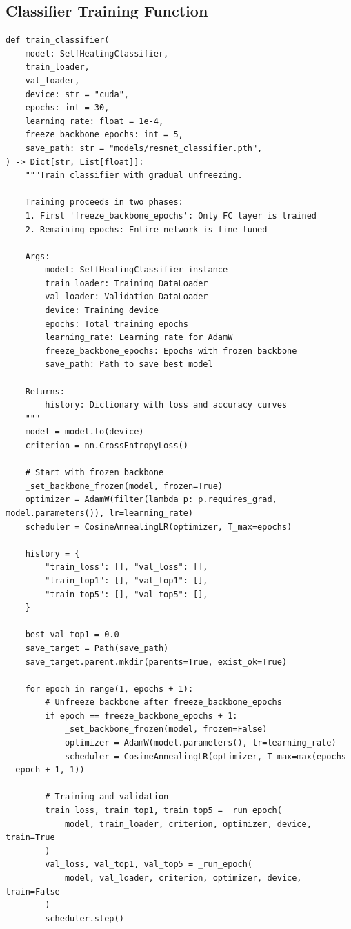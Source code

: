 \documentclass[11pt,a4paper]{article}
\begin{document}
\subsection{Classifier Training Function}

\begin{lstlisting}[caption={src/train\_classifier.py - Main Training Function}, label={lst:train-classifier}]
def train_classifier(
    model: SelfHealingClassifier,
    train_loader,
    val_loader,
    device: str = "cuda",
    epochs: int = 30,
    learning_rate: float = 1e-4,
    freeze_backbone_epochs: int = 5,
    save_path: str = "models/resnet_classifier.pth",
) -> Dict[str, List[float]]:
    """Train classifier with gradual unfreezing.

    Training proceeds in two phases:
    1. First 'freeze_backbone_epochs': Only FC layer is trained
    2. Remaining epochs: Entire network is fine-tuned

    Args:
        model: SelfHealingClassifier instance
        train_loader: Training DataLoader
        val_loader: Validation DataLoader
        device: Training device
        epochs: Total training epochs
        learning_rate: Learning rate for AdamW
        freeze_backbone_epochs: Epochs with frozen backbone
        save_path: Path to save best model

    Returns:
        history: Dictionary with loss and accuracy curves
    """
    model = model.to(device)
    criterion = nn.CrossEntropyLoss()

    # Start with frozen backbone
    _set_backbone_frozen(model, frozen=True)
    optimizer = AdamW(filter(lambda p: p.requires_grad, model.parameters()), lr=learning_rate)
    scheduler = CosineAnnealingLR(optimizer, T_max=epochs)

    history = {
        "train_loss": [], "val_loss": [],
        "train_top1": [], "val_top1": [],
        "train_top5": [], "val_top5": [],
    }

    best_val_top1 = 0.0
    save_target = Path(save_path)
    save_target.parent.mkdir(parents=True, exist_ok=True)

    for epoch in range(1, epochs + 1):
        # Unfreeze backbone after freeze_backbone_epochs
        if epoch == freeze_backbone_epochs + 1:
            _set_backbone_frozen(model, frozen=False)
            optimizer = AdamW(model.parameters(), lr=learning_rate)
            scheduler = CosineAnnealingLR(optimizer, T_max=max(epochs - epoch + 1, 1))

        # Training and validation
        train_loss, train_top1, train_top5 = _run_epoch(
            model, train_loader, criterion, optimizer, device, train=True
        )
        val_loss, val_top1, val_top5 = _run_epoch(
            model, val_loader, criterion, optimizer, device, train=False
        )
        scheduler.step()


\end{lstlisting}
\end{document}
